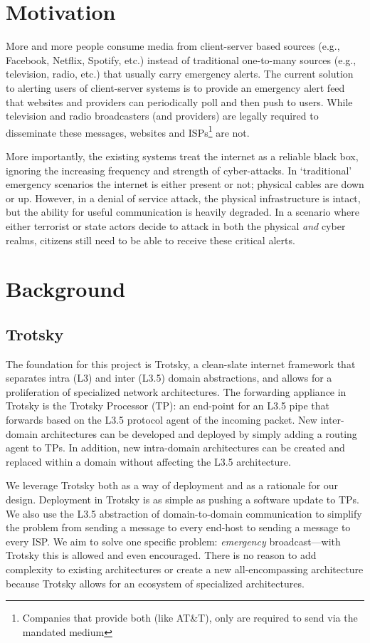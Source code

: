 \section{Motivation}

More and more people consume media from client-server based sources (e.g., Facebook, Netflix, Spotify, etc.) instead of traditional one-to-many sources (e.g., television, radio, etc.) that usually carry emergency alerts. The current solution to alerting users of client-server systems is to provide an emergency alert feed that websites and providers can periodically poll and then push to users. While television and radio broadcasters (and providers) are legally required to disseminate these messages, websites and ISPs\footnote{Companies that provide both (like AT\&T), only are required to send via the mandated medium} are not.\cite{cfr47}

More importantly, the existing systems treat the internet as a reliable black box, ignoring the increasing frequency and strength of cyber-attacks. In `traditional' emergency scenarios the internet is either present or not; physical cables are down or up. However, in a denial of service attack, the physical infrastructure is intact, but the ability for useful communication is heavily degraded. In a scenario where either terrorist or state actors decide to attack in both the physical \textit{and} cyber realms, citizens still need to be able to receive these critical alerts.

\section{Background}
\subsection{Trotsky}
The foundation for this project is Trotsky, a clean-slate internet framework that separates intra (L3) and inter (L3.5) domain abstractions, and allows for a proliferation of specialized network architectures. The forwarding appliance in Trotsky is the Trotsky Processor (TP): an end-point for an L3.5 pipe that forwards based on the L3.5 protocol agent of the incoming packet. New inter-domain architectures can be developed and deployed by simply adding a routing agent to TPs. In addition, new intra-domain architectures can be created and replaced within a domain without affecting the L3.5 architecture.

We leverage Trotsky both as a way of deployment and as a rationale for our design. Deployment in Trotsky is as simple as pushing a software update to TPs. We also use the L3.5 abstraction of domain-to-domain communication to simplify the problem from sending a message to every end-host to sending a message to every ISP. We aim to solve one specific problem: \textit{emergency} broadcast---with Trotsky this is allowed and even encouraged. There is no reason to add complexity to existing architectures or create a new all-encompassing architecture because Trotsky allows for an ecosystem of specialized architectures. 

